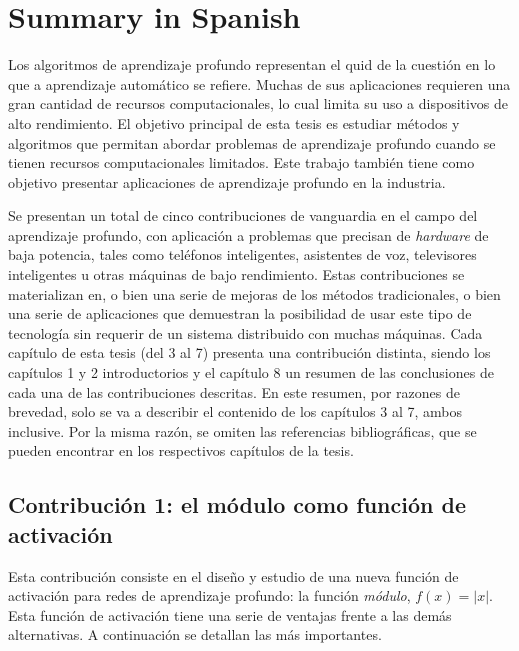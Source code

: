 
\chapter*{Summary in Spanish}


Los algoritmos de aprendizaje profundo representan el quid de la cuestión en lo que a aprendizaje automático se refiere. Muchas de sus aplicaciones requieren una gran cantidad de recursos computacionales, lo cual limita su uso a dispositivos de alto rendimiento. El objetivo principal de esta tesis es estudiar métodos y algoritmos que permitan abordar problemas de aprendizaje profundo cuando se tienen recursos computacionales limitados. Este trabajo también tiene como objetivo presentar aplicaciones de aprendizaje profundo en la industria.

Se presentan un total de cinco contribuciones de vanguardia en el campo del aprendizaje profundo, con aplicación a problemas que precisan de \textit{hardware} de baja potencia, tales como teléfonos inteligentes, asistentes de voz, televisores inteligentes u otras máquinas de bajo rendimiento. Estas contribuciones se materializan en, o bien una serie de mejoras de los métodos tradicionales, o bien una serie de aplicaciones que demuestran la posibilidad de usar este tipo de tecnología sin requerir de un sistema distribuido con muchas máquinas. Cada capítulo de esta tesis (del 3 al 7) presenta una contribución distinta, siendo los capítulos 1 y 2 introductorios y el capítulo 8 un resumen de las conclusiones de cada una de las contribuciones descritas. En este resumen, por razones de brevedad, solo se va a describir el contenido de los capítulos 3 al 7, ambos inclusive.  Por la misma razón, se omiten las referencias bibliográficas, que se pueden encontrar en los respectivos capítulos de la tesis.


\section*{Contribución 1: el módulo como función de activación}
Esta contribución consiste en el diseño y estudio de una nueva función de activación para redes de aprendizaje profundo: la función \textit{módulo}, $f(x) = |x|$. Esta función de activación tiene una serie de ventajas frente a las demás alternativas. A continuación se detallan las más importantes.


